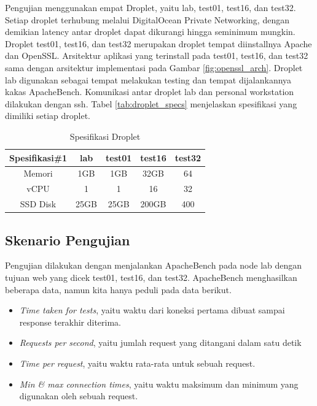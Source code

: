 Pengujian menggunakan empat Droplet, yaitu lab, test01, test16, dan test32. Setiap droplet terhubung melalui DigitalOcean Private Networking, dengan demikian latency antar droplet dapat dikurangi hingga seminimum mungkin. Droplet test01, test16, dan test32 merupakan droplet tempat diinstallnya Apache dan OpenSSL. Arsitektur aplikasi yang terinstall pada test01, test16, dan test32 sama dengan arsitektur implementasi pada Gambar \ref{fig:openssl_arch}. Droplet lab digunakan sebagai tempat melakukan testing dan tempat dijalankannya kakas ApacheBench. Komunikasi antar droplet lab dan personal workstation dilakukan dengan ssh. Tabel \ref{tab:droplet_specs} menjelaskan spesifikasi yang dimiliki setiap droplet.

\begin{table}[ht]
\caption{Spesifikasi Droplet} %
\label{tab:droplet_specs}
\centering %
\begin{tabular}{|| c | c c c c ||} %
\hline\hline %
Spesifikasi\#1 & lab & test01 & test16 & test32\\[0.5ex] %
\hline %
Memori    & 1GB   & 1GB   & 32GB  & 64 \\
vCPU      & 1     & 1     & 16    & 32 \\
SSD Disk  & 25GB  & 25GB  & 200GB & 400 \\ [1ex] %
\hline\hline %
\end{tabular}
\label{table:nonlin} %
\end{table}

\subsection{Skenario Pengujian}
Pengujian dilakukan dengan menjalankan ApacheBench pada node lab dengan tujuan web yang dicek test01, test16, dan test32. ApacheBench menghasilkan beberapa data, namun kita hanya peduli pada data berikut.
\begin{itemize}
  \item \textit{Time taken for tests}, yaitu waktu dari koneksi pertama dibuat sampai response terakhir diterima.
  \item \textit{Requests per second}, yaitu jumlah request yang ditangani dalam satu detik
  \item \textit{Time per request}, yaitu waktu rata-rata untuk sebuah request.
  \item \textit{Min \& max connection times}, yaitu waktu maksimum dan minimum yang digunakan oleh sebuah request.
\end{itemize}

